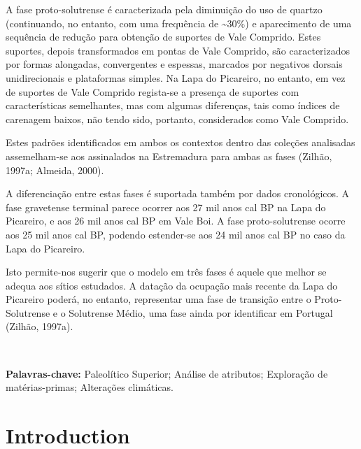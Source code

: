 \documentclass[12pt,twoside]{reedthesis}
\begin{document}
\begin{resumo}
    A fase proto-solutrense é caracterizada pela diminuição do uso de quartzo (continuando, no entanto, com uma frequência de \textasciitilde30\%) e aparecimento de uma sequência de redução para obtenção de suportes de Vale Comprido. Estes suportes, depois transformados em pontas de Vale Comprido, são caracterizados por formas alongadas, convergentes e espessas, marcados por negativos dorsais unidirecionais e plataformas simples. Na Lapa do Picareiro, no entanto, em vez de suportes de Vale Comprido regista-se a presença de suportes com características semelhantes, mas com algumas diferenças, tais como índices de carenagem baixos, não tendo sido, portanto, considerados como Vale Comprido.
    
    Estes padrões identificados em ambos os contextos dentro das coleções analisadas assemelham-se aos assinalados na Estremadura para ambas as fases (Zilhão, 1997a; Almeida, 2000).
    
    A diferenciação entre estas fases é suportada também por dados cronológicos. A fase gravetense terminal parece ocorrer aos 27 mil anos cal BP na Lapa do Picareiro, e aos 26 mil anos cal BP em Vale Boi. A fase proto-solutrense ocorre aos 25 mil anos cal BP, podendo estender-se aos 24 mil anos cal BP no caso da Lapa do Picareiro.
    
    Isto permite-nos sugerir que o modelo em três fases é aquele que melhor se adequa aos sítios estudados. A datação da ocupação mais recente da Lapa do Picareiro poderá, no entanto, representar uma fase de transição entre o Proto-Solutrense e o Solutrense Médio, uma fase ainda por identificar em Portugal (Zilhão, 1997a).
    
    ~
    
    \textbf{Palavras-chave:} Paleolítico Superior; Análise de atributos; Exploração de matérias-primas; Alterações climáticas.
  \end{resumo}
  \hypersetup{linkcolor=black}
  \setcounter{tocdepth}{2}
  \tableofcontents

  \listoftables

  \listoffigures


\mainmatter %
\pagestyle{fancyplain} %

\hypertarget{introduction}{%
\chapter{Introduction}\label{introduction}}
\end{document}
